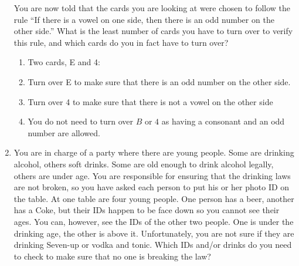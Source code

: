 \documentclass[]{article}
\begin{document}
\begin{enumerate}
		You are now told that the cards you are looking at were chosen to follow the rule “If there is a vowel on one side, then there is an odd number on the other side.” What is the least number of cards you have to turn over to verify this rule, and which cards do you in fact have to turn over?
		\begin{enumerate}
			\item Two cards, E and 4:
			\item Turn over E to make sure that there is an odd number on the other side.
			\item Turn over 4 to make sure that there is not a vowel on the other side
			\item You do not need to turn over $B$ or $4$ as having a consonant and an odd number are allowed.
		\end{enumerate}
		\setcounter{enumi}{10}
		\item You are in charge of a party where there are young people. Some are drinking alcohol, others soft drinks. Some are old enough to drink alcohol legally, others are under age. You are responsible for ensuring that the drinking laws are not broken, so you have asked each person to put his or her photo ID on the table. At one table are four young people. One person has a beer, another has a Coke, but their IDs happen to be face down so you cannot see their ages. You can, however, see the IDs of the other two people. One is under the drinking age, the other is above it. Unfortunately, you are not sure if they are drinking Seven-up or vodka and tonic. Which IDs and/or drinks do you need to check to make sure that no one is breaking the law?
\end{enumerate}
\end{document}
